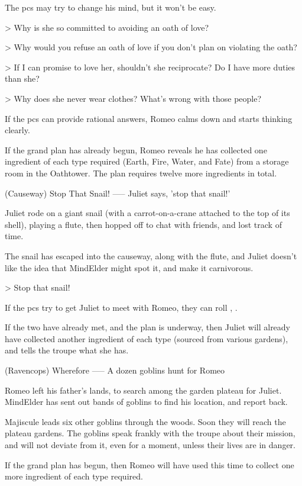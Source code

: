 The \glspl{pc} may try to change his mind, but it won't be easy.

> Why is she so committed to avoiding an oath of love?

> Why would you refuse an oath of love if you don't plan on violating the oath?

> If I can promise to love her, shouldn't she reciprocate?  Do I have more duties than she?

> Why does she never wear clothes?  What's wrong with those people?

If the \glspl{pc} can provide rational answers, Romeo calms down and starts thinking clearly.

If the grand plan has already begun,
Romeo reveals he has collected one \gls{ingredient} of each type required (Earth, Fire, Water, and Fate) from a storage room in the Oathtower.
The plan requires twelve more \glspl{ingredient} in total.

(Causeway) Stop That Snail!
-----
{Juliet says, 'stop that snail!'}

Juliet rode on a giant snail (with a carrot-on-a-crane attached to the top of its shell), playing a flute, then hopped off to chat with friends, and lost track of time.

The snail has escaped into the causeway, along with the flute, and Juliet doesn't like the idea that MindElder might spot it, and make it carnivorous.

> Stop that snail!

If the \glspl{pc} try to get Juliet to meet with Romeo,
they can roll , \tn[5].

If the two have already met, and the plan is underway,
then Juliet will already have collected another \gls{ingredient} of each type (sourced from various gardens), and tells the troupe what she has.

(Ravencops) Wherefore
-----
{A dozen goblins hunt for Romeo}

Romeo left his father's lands, to search among the garden plateau for Juliet.
MindElder has sent out bands of goblins to find his location, and report back.

Majiscule leads six other goblins through the woods.
Soon they will reach the plateau gardens.
The goblins speak frankly with the troupe about their mission, and will not deviate from it, even for a moment, unless their lives are in danger.

If the grand plan has begun,
then Romeo will have used this time to collect one more \gls{ingredient} of each type required.


